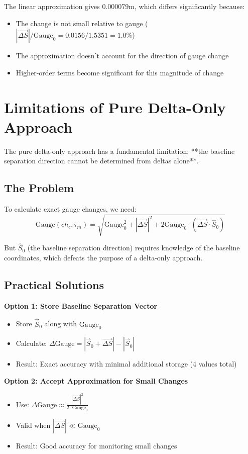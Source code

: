 \documentclass{article}
\begin{document}
The linear approximation gives $0.000079\text{m}$, which differs significantly because:
\begin{itemize}
\item The change is not small relative to gauge ($|\vec{\Delta S}|/\text{Gauge}_0 = 0.0156/1.5351 = 1.0\%$)
\item The approximation doesn't account for the direction of gauge change
\item Higher-order terms become significant for this magnitude of change
\end{itemize}

\section{Limitations of Pure Delta-Only Approach}
The pure delta-only approach has a fundamental limitation: **the baseline separation direction cannot be determined from deltas alone**.

\subsection{The Problem}
To calculate exact gauge changes, we need:
\begin{equation}
\text{Gauge}(ch_c, \tau_m) = \sqrt{\text{Gauge}_0^2 + |\vec{\Delta S}|^2 + 2\text{Gauge}_0 \cdot (\vec{\Delta S} \cdot \hat{S}_0)}
\end{equation}

But $\hat{S}_0$ (the baseline separation direction) requires knowledge of the baseline coordinates, which defeats the purpose of a delta-only approach.

\subsection{Practical Solutions}
\textbf{Option 1: Store Baseline Separation Vector}
\begin{itemize}
\item Store $\vec{S}_0$ along with $\text{Gauge}_0$
\item Calculate: $\Delta\text{Gauge} = |\vec{S}_0 + \vec{\Delta S}| - |\vec{S}_0|$
\item Result: Exact accuracy with minimal additional storage (4 values total)
\end{itemize}

\textbf{Option 2: Accept Approximation for Small Changes}
\begin{itemize}
\item Use: $\Delta\text{Gauge} \approx \frac{|\vec{\Delta S}|^2}{2 \cdot \text{Gauge}_0}$
\item Valid when $|\vec{\Delta S}| \ll \text{Gauge}_0$
\item Result: Good accuracy for monitoring small changes
\end{itemize}
\end{document}

